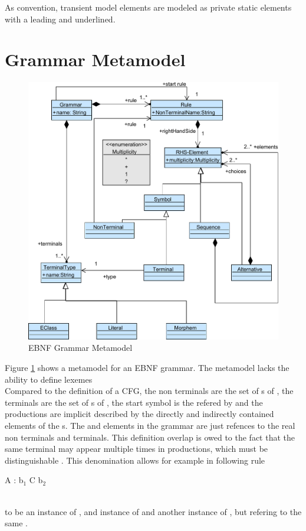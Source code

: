As convention, transient model elements are modeled as private static elements with a leading \code{-} and underlined.

\section{Grammar Metamodel}
\begin{figure}
\centering
\includegraphics[scale=0.85]{gfx/ex/Grammar_CFG} 
\caption{EBNF Grammar Metamodel}
\label{MM:EBNF}
\end{figure}

Figure \ref{MM:EBNF} shows a metamodel for an EBNF grammar. The metamodel lacks the ability to define lexemes  \\
Compared to the definition of a CFG, the non terminals are the set of s of , the terminals are the set of s of , the start symbol is the  refered by  and the productions are implicit described by the directly and indirectly contained elements of the s. The  and  elements in the grammar are just refences to the real non terminals and terminals. This definition overlap is owed to the fact that the same terminal may appear multiple times in productions, which must be distinguishable . This denomination allows for example in following rule
\\\begin{code}
A : b$_1$ C b$_2$
\end{code}\\
to be  an instance of ,  and instance of  and  another instance of , but refering to the same .

